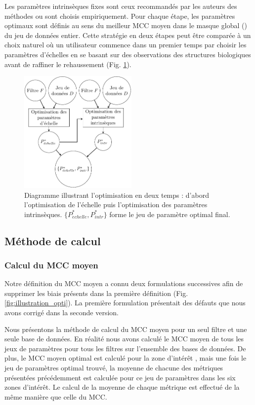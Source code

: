 Les paramètres intrinsèques fixes sont ceux recommandés par les auteurs des méthodes ou sont choisis empiriquement.  Pour chaque étape, les paramètres optimaux sont définis au sens du meilleur MCC moyen dans le masque global (\maskglobal) du jeu de données entier. Cette stratégie en deux étapes peut être comparée à un choix naturel où un utilisateur commence dans un premier temps par choisir les paramètres d'échelles en se basant sur des observations des structures biologiques avant de raffiner le rehaussement (Fig. \ref{fig:flowchart_opti}).

\begin{figure}[!ht]
  \centering
  \includegraphics[height=6cm]{Images/flowchart_benchmark.pdf}
  \caption{Diagramme illustrant l'optimisation en deux temps : d'abord l'optimisation de l'échelle puis l'optimisation des paramètres intrinsèques. $\{P^*_{\acute{e}chelle},P^*_{intr}\}$ forme le jeu de paramètre optimal final.}
  \label{fig:flowchart_opti}
\end{figure}


\subsection{Méthode de calcul}
\subsubsection{Calcul du MCC moyen}

  Notre définition du MCC moyen a connu deux formulations successives afin de supprimer les biais présents dans la première définition (Fig. \ref{fig:illustration_opti}). La première formulation présentait des défauts que nous avons corrigé dans la seconde version.
  
  Nous présentons la méthode de calcul du MCC moyen pour un  seul filtre et une seule base de données. En réalité nous avons calculé le MCC moyen de tous les jeux de paramètres pour tous les filtres sur l'ensemble des bases de données. De plus, le MCC moyen optimal est calculé pour la zone d'intérêt \maskglobal, mais une fois le jeu de paramètres optimal trouvé, la moyenne de chacune des métriques présentées précédemment est calculée pour ce jeu de paramètres dans les six zones d'intérêt. Le calcul de la moyenne de chaque métrique est effectué de la même manière que celle du MCC.    

